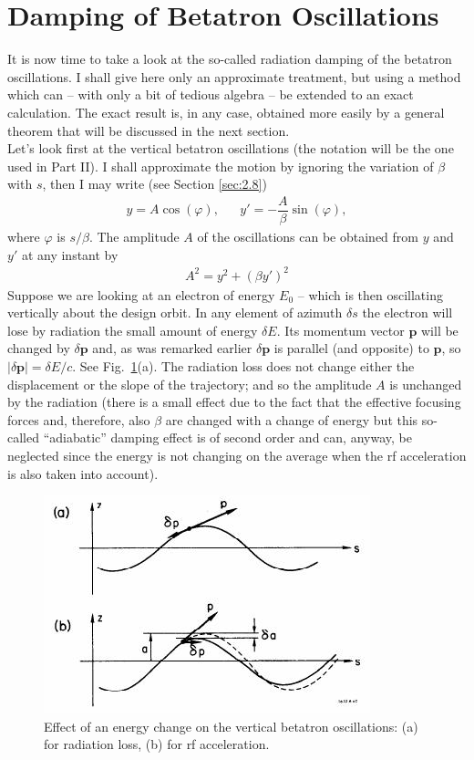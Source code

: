 \section{Damping of Betatron Oscillations}\label{sec:4.3}
It is now time to take a look at the so-called radiation damping of the betatron oscillations. I shall give here only an approximate treatment, but using a method which can -- with only a bit of tedious algebra -- be extended to an exact calculation. The exact result is, in any case, obtained more easily by a general theorem that will be discussed in the next section.\\
Let's look first at the vertical betatron oscillations (the notation will be the one used in Part II). I shall approximate the motion by ignoring the variation of $\beta$ with $s$, then I may write (see Section \ref{sec:2.8})
\begin{align}
	y = A \cos(\varphi), && y' = - \dfrac{A}{\beta}\sin(\varphi),
\end{align}
where $\varphi$ is $s/\beta$. The amplitude $A$ of the oscillations can be obtained from $y$ and
$y'$ at any instant by
\begin{align}
	A^2 = y^2 + (\beta y')^2
\end{align}
Suppose we are looking at an electron of energy $E_0$ -- which is then oscillating vertically
 about the design orbit. In any element of azimuth $\delta s$ the electron will lose by radiation
 the small amount of energy $\delta E$. Its momentum vector $\bm{p}$ will be changed by $\delta \bm{p}$ and, as was remarked earlier $\delta \bm{p}$ is parallel (and opposite) to $\bm{p}$, so $|\delta \bm{p}| = \delta E/c$. See Fig.~\ref{fig:fig40}(a). The radiation loss does not change either the displacement or the slope of the trajectory; and so the amplitude $A$ is unchanged
by the radiation (there is a small effect due to the fact that the effective focusing forces and, therefore, also $\beta$ are changed with a change of energy but this so-called ``adiabatic'' damping effect is of second order and can, anyway, be neglected since the energy is not changing on the average when the rf acceleration is also taken into account).

\begin{figure}[!htb]
	\centering
	\includegraphics[width=0.8\linewidth]{./Figuras/fig40.jpeg}
	\caption{Effect of an energy change on the vertical betatron oscillations: (a) for radiation loss, (b) for rf acceleration.}
	\label{fig:fig40}
\end{figure}

